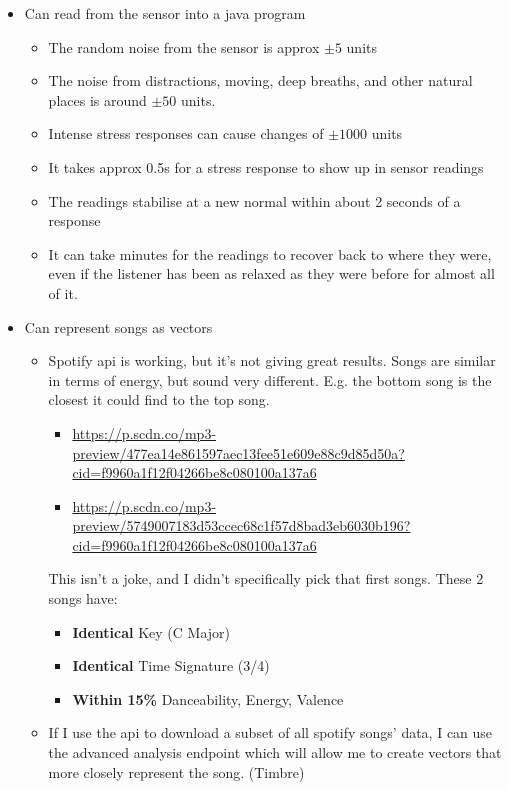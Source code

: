 \documentclass{article}
\begin{document}
	\begin{itemize}
		\item Can read from the sensor into a java program
		\begin{itemize}
			\item The random noise from the sensor is approx $\pm5$ units
			\item The noise from distractions, moving, deep breaths, and other natural places is around $\pm50$ units.
			\item Intense stress responses can cause changes of $\pm1000$ units
			\item It takes approx 0.5s for a stress response to show up in sensor readings
			\item The readings stabilise at a new normal within about 2 seconds of a response
			\item It can take minutes for the readings to recover back to where they were, even if the listener has been as relaxed as they were before for almost all of it.
		\end{itemize}
		\item Can represent songs as vectors
		\begin{itemize}
			\item Spotify api is working, but it's not giving great results. Songs are similar in terms of energy, but sound very different. E.g. the bottom song is the closest it could find to the top song.
			
			\begin{itemize}
				\item \hyperlink{ID 3E6Ydoy1H8ePoigc10Mgsa}{https://p.scdn.co/mp3-preview/477ea14e861597aec13fee51e609e88c9d85d50a?cid=f9960a1f12f04266be8c080100a137a6}
				\item \hyperlink{ID 3KNQFdsXrTvG9CF3BioxIa}{https://p.scdn.co/mp3-preview/5749007183d53ccec68c1f57d8bad3eb6030b196?cid=f9960a1f12f04266be8c080100a137a6}
			\end{itemize}
		
			This isn't a joke, and I didn't specifically pick that first songs. These 2 songs have:
			
			\begin{itemize}
				\item \textbf{Identical} Key (C Major)
				\item \textbf{Identical} Time Signature (3/4)
				\item \textbf{Within 15\%} Danceability, Energy, Valence
			\end{itemize}
			
			\item If I use the api to download a subset of all spotify songs' data, I can use the advanced analysis endpoint which will allow me to create vectors that more closely represent the song. (Timbre)
		\end{itemize}
	\end{itemize}
\end{document}
